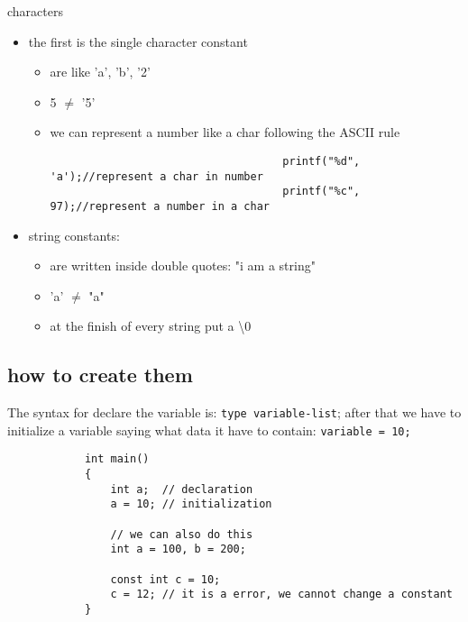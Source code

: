 \begin{itemize}
                
                characters
                    \begin{itemize}
                        \item the first is the single character constant
                            \begin{itemize}
                                \item are like 'a', 'b', '2'
                                \item 5 $\neq$ '5'
                                \item we can represent a number like a char following the ASCII rule 
                                \begin{lstlisting}
                                    printf("%d", 'a');//represent a char in number 
                                    printf("%c", 97);//represent a number in a char 
                                \end{lstlisting}
                            \end{itemize}
                            \item string constants:
                                \begin{itemize}
                                    \item are written inside double quotes: "i am a string"
                                    \item 'a' $\neq$ "a"
                                    \item at the finish of every string put a \textbackslash 0
                                \end{itemize}
                    \end{itemize}
            \end{itemize}

        \subsection{how to create them}
         The syntax for declare the variable is: \texttt{type variable-list}; after that we have to initialize a variable saying what data it have to contain: \texttt{variable = 10;}
         
        \begin{lstlisting}
            int main()
            {
                int a;  // declaration
                a = 10; // initialization

                // we can also do this
                int a = 100, b = 200;

                const int c = 10; 
                c = 12; // it is a error, we cannot change a constant
            }
        \end{lstlisting}

